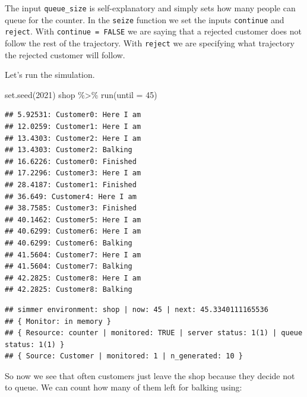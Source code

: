 \documentclass[
]{book}
\newenvironment{Shaded}{\begin{snugshade}}{\end{snugshade}}
\newcommand{\AttributeTok}[1]{\textcolor[rgb]{0.77,0.63,0.00}{#1}}
\newcommand{\DecValTok}[1]{\textcolor[rgb]{0.00,0.00,0.81}{#1}}
\newcommand{\FunctionTok}[1]{\textcolor[rgb]{0.00,0.00,0.00}{#1}}
\newcommand{\NormalTok}[1]{#1}
\newcommand{\SpecialCharTok}[1]{\textcolor[rgb]{0.00,0.00,0.00}{#1}}
\begin{document}
The input \texttt{queue\_size} is self-explanatory and simply sets how many people can queue for the counter. In the \texttt{seize} function we set the inputs \texttt{continue} and \texttt{reject}. With \texttt{continue\ =\ FALSE} we are saying that a rejected customer does not follow the rest of the trajectory. With \texttt{reject} we are specifying what trajectory the rejected customer will follow.

Let's run the simulation.

\begin{Shaded}
\begin{Highlighting}[]
\FunctionTok{set.seed}\NormalTok{(}\DecValTok{2021}\NormalTok{)}
\NormalTok{shop }\SpecialCharTok{\%\textgreater{}\%} \FunctionTok{run}\NormalTok{(}\AttributeTok{until =} \DecValTok{45}\NormalTok{)}
\end{Highlighting}
\end{Shaded}

\begin{verbatim}
## 5.92531: Customer0: Here I am
## 12.0259: Customer1: Here I am
## 13.4303: Customer2: Here I am
## 13.4303: Customer2: Balking
## 16.6226: Customer0: Finished
## 17.2296: Customer3: Here I am
## 28.4187: Customer1: Finished
## 36.649: Customer4: Here I am
## 38.7585: Customer3: Finished
## 40.1462: Customer5: Here I am
## 40.6299: Customer6: Here I am
## 40.6299: Customer6: Balking
## 41.5604: Customer7: Here I am
## 41.5604: Customer7: Balking
## 42.2825: Customer8: Here I am
## 42.2825: Customer8: Balking
\end{verbatim}

\begin{verbatim}
## simmer environment: shop | now: 45 | next: 45.3340111165536
## { Monitor: in memory }
## { Resource: counter | monitored: TRUE | server status: 1(1) | queue status: 1(1) }
## { Source: Customer | monitored: 1 | n_generated: 10 }
\end{verbatim}

So now we see that often customers just leave the shop because they decide not to queue. We can count how many of them left for balking using:

\begin{Shaded}
\end{Shaded}
\end{document}

